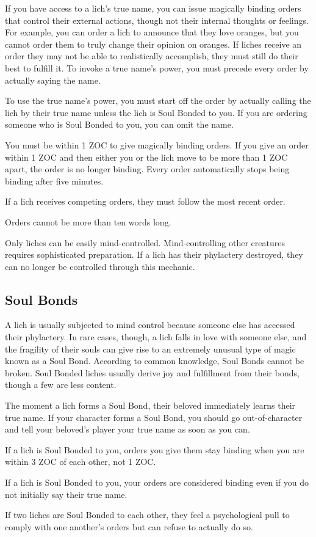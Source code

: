 \documentclass[green]{Sel}
\begin{document}
\name{\gMindControl{}}
If you have access to a lich's true name, you can issue magically binding orders that control their external actions, though not their internal thoughts or feelings. For example, you can order a lich to announce that they love oranges, but you cannot order them to truly change their opinion on oranges. If liches receive an order they may not be able to realistically accomplish, they must still do their best to fulfill it. To invoke a true name's power, you must precede every order by actually saying the name.

To use the true name's power, you must start off the order by actually calling the lich by their true name unless the lich is Soul Bonded to you. If you are ordering someone who is Soul Bonded to you, you can omit the name.

You must be within 1 ZOC to give magically binding orders. If you give an order within 1 ZOC and then either you or the lich move to be more than 1 ZOC apart, the order is no longer binding. Every order automatically stops being binding after five minutes.

If a lich receives competing orders, they must follow the most recent order.

Orders cannot be more than ten words long.

Only liches can be easily mind-controlled. Mind-controlling other creatures requires sophisticated preparation. If a lich has their phylactery destroyed, they can no longer be controlled through this mechanic.

\subsection{Soul Bonds}

A lich is usually subjected to mind control because someone else has accessed their phylactery. In rare cases, though, a lich falls in love with someone else, and the fragility of their souls can give rise to an extremely unusual type of magic known as a Soul Bond. According to common knowledge, Soul Bonds cannot be broken. Soul Bonded liches usually derive joy and fulfillment from their bonds, though a few are less content.

The moment a lich forms a Soul Bond, their beloved immediately learns their true name. If your character forms a Soul Bond, you should go out-of-character and tell your beloved's player your true name as soon as you can.

If a lich is Soul Bonded to you, orders you give them stay binding when you are within 3 ZOC of each other, not 1 ZOC.

If a lich is Soul Bonded to you, your orders are considered binding even if you do not initially say their true name.

If two liches are Soul Bonded to each other, they feel a psychological pull to comply with one another’s orders but can refuse to actually do so.
\end{document}
